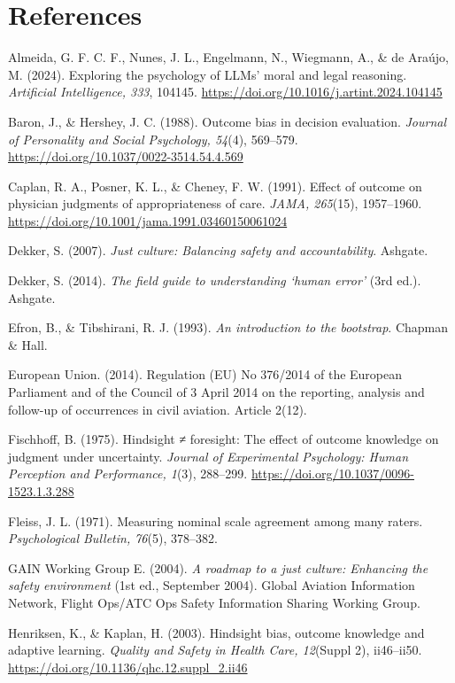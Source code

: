 \documentclass[11pt]{article}
\begin{document}
\section*{References}
{\setlength{\parindent}{-1.5em}\setlength{\leftskip}{1.5em}\setlength{\parskip}{3pt}
Almeida, G. F. C. F., Nunes, J. L., Engelmann, N., Wiegmann, A., \& de Araújo, M. (2024). Exploring the psychology of LLMs' moral and legal reasoning. \emph{Artificial Intelligence, 333}, 104145. \url{https://doi.org/10.1016/j.artint.2024.104145}

Baron, J., \& Hershey, J. C. (1988). Outcome bias in decision evaluation. \emph{Journal of Personality and Social Psychology, 54}(4), 569--579. \url{https://doi.org/10.1037/0022-3514.54.4.569}

Caplan, R. A., Posner, K. L., \& Cheney, F. W. (1991). Effect of outcome on physician judgments of appropriateness of care. \emph{JAMA, 265}(15), 1957--1960. \url{https://doi.org/10.1001/jama.1991.03460150061024}

Dekker, S. (2007). \emph{Just culture: Balancing safety and accountability}. Ashgate.

Dekker, S. (2014). \emph{The field guide to understanding `human error'} (3rd ed.). Ashgate.

Efron, B., \& Tibshirani, R. J. (1993). \emph{An introduction to the bootstrap}. Chapman \& Hall.

European Union. (2014). Regulation (EU) No 376/2014 of the European Parliament and of the Council of 3 April 2014 on the reporting, analysis and follow-up of occurrences in civil aviation. Article 2(12).

Fischhoff, B. (1975). Hindsight ≠ foresight: The effect of outcome knowledge on judgment under uncertainty. \emph{Journal of Experimental Psychology: Human Perception and Performance, 1}(3), 288--299. \url{https://doi.org/10.1037/0096-1523.1.3.288}

Fleiss, J. L. (1971). Measuring nominal scale agreement among many raters. \emph{Psychological Bulletin, 76}(5), 378--382.

GAIN Working Group E. (2004). \emph{A roadmap to a just culture: Enhancing the safety environment} (1st ed., September 2004). Global Aviation Information Network, Flight Ops/ATC Ops Safety Information Sharing Working Group.

Henriksen, K., \& Kaplan, H. (2003). Hindsight bias, outcome knowledge and adaptive learning. \emph{Quality and Safety in Health Care, 12}(Suppl 2), ii46--ii50. \url{https://doi.org/10.1136/qhc.12.suppl\_2.ii46}

}
\end{document}
